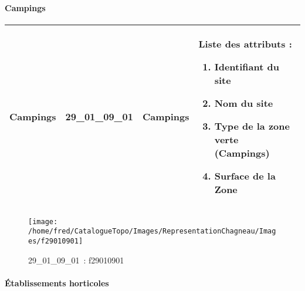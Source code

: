 \documentclass[12pt,titlepage]{book}
\begin{document}
\paragraph{Campings}
\noindent
\vspace{\baselineskip}

\renewcommand{\arraystretch}{1.2}
\begin{supertabular}{|p{10cm}|c|p{13cm}|p{12cm}|}
 Campings & 29\_01\_09\_01 & Campings & Liste des attributs :
\begin{enumerate}
  \item Identifiant du site  \item Nom du site  \item Type de la zone verte (Campings)  \item Surface de la Zone\end{enumerate}
\\
\hline
\end{supertabular}
\begin{figure}[h!]
  \hfill         %
  \begin{minipage}[t]{3cm}
    \begin{center}
      \texttt{[image: /home/fred/CatalogueTopo/Images/RepresentationChagneau/Images/f29010901]}
      \caption[~29\_01\_09\_01]{\small{29\_01\_09\_01~:} \tiny{f29010901}}\label{f29010901}
    \end{center}
  \end{minipage}
\end{figure}


\paragraph{Établissements horticoles}
\noindent
\vspace{\baselineskip}
\end{document}
